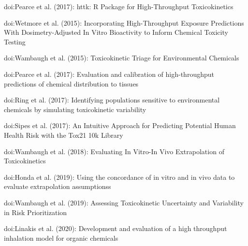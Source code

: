\documentclass[a4paper]{book}
\begin{document}
\begin{SeeAlso}\relax
{}

doi:\nobreakspace{}Pearce et al. (2017): httk: R
Package for High-Throughput Toxicokinetics

doi:\nobreakspace{}Wetmore et al. (2015):
Incorporating High-Throughput Exposure Predictions With Dosimetry-Adjusted
In Vitro Bioactivity to Inform Chemical Toxicity Testing

doi:\nobreakspace{}Wambaugh et al. (2015):
Toxicokinetic Triage for Environmental Chemicals

doi:\nobreakspace{}Pearce et al. (2017):
Evaluation and calibration of high-throughput predictions of chemical
distribution to tissues

doi:\nobreakspace{}Ring et al. (2017):
Identifying populations sensitive to environmental chemicals by simulating
toxicokinetic variability

doi:\nobreakspace{}Sipes et al. (2017): An
Intuitive Approach for Predicting Potential Human Health Risk with the Tox21
10k Library

doi:\nobreakspace{}Wambaugh et al. (2018):
Evaluating In Vitro-In Vivo Extrapolation of Toxicokinetics

doi:\nobreakspace{}Honda et al. (2019):
Using the concordance of in vitro and in vivo data to evaluate extrapolation assumptionss

doi:\nobreakspace{}Wambaugh et al. (2019):
Assessing Toxicokinetic Uncertainty and Variability in Risk Prioritization

doi:\nobreakspace{}Linakis et al. (2020):
Development and evaluation of a high throughput inhalation model for organic chemicals

\end{SeeAlso}
\end{document}
